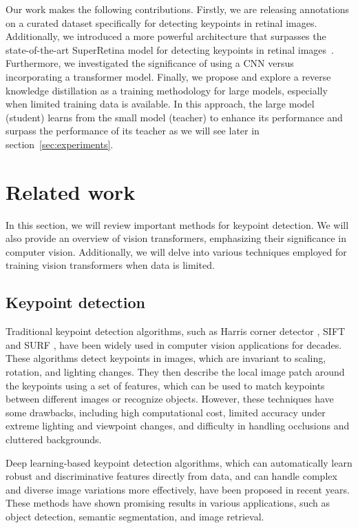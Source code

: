 \documentclass[10pt,twocolumn,letterpaper]{article}
\begin{document}
Our work makes the following contributions. Firstly, we are releasing annotations on a curated dataset specifically for detecting keypoints in retinal images. Additionally, we introduced a more powerful architecture that surpasses the state-of-the-art SuperRetina model for detecting keypoints in retinal images~\cite{liu2022semi}. Furthermore, we investigated the significance of using a CNN versus incorporating a transformer model. Finally, we propose and explore a reverse knowledge distillation as a training methodology for large models, especially when limited training data is available. In this approach, the large model (student) learns from the small model (teacher) to enhance its performance and surpass the performance of its teacher as we will see later in section~\ref{sec:experiments}.









\section{Related work}
\label{sec:related}

In this section, we will review important methods for keypoint detection. We will also provide an overview of vision transformers, emphasizing their significance in computer vision. Additionally, we will delve into various techniques employed for training vision transformers when data is limited.


\subsection{Keypoint detection}

Traditional keypoint detection algorithms, such as Harris corner detector \cite{ryu2011formula}, SIFT \cite{lowe2004distinctive} and SURF \cite{bay2006surf}, have been widely used in computer vision applications for decades. These algorithms detect keypoints in images, which are invariant to scaling, rotation, and lighting changes. They then describe the local image patch around the keypoints using a set of features, which can be used to match keypoints between different images or recognize objects. However, these techniques have some drawbacks, including high computational cost, limited accuracy under extreme lighting and viewpoint changes, and difficulty in handling occlusions and cluttered backgrounds. 

Deep learning-based keypoint detection algorithms, which can automatically learn robust and discriminative features directly from data, and can handle complex and diverse image variations more effectively, have been proposed in recent years. These methods have shown promising results in various applications, such as object detection, semantic segmentation, and image retrieval.
\end{document}
